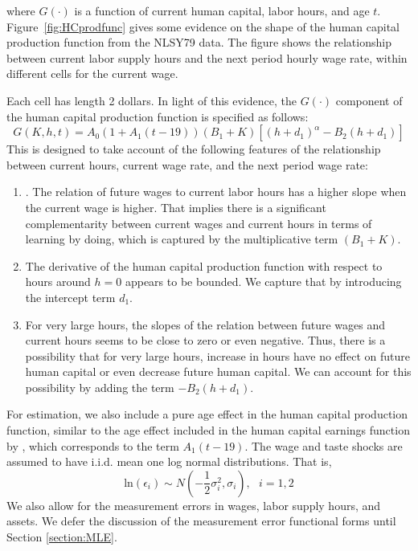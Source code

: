 \documentclass[\econtexRoot/ImaiKeane]{subfiles}
\begin{document}
  where $G(\cdot)$ is a function of current human capital, labor hours, and age $t$. Figure~\ref{fig:HCprodfunc} gives some evidence on the shape of the human capital production function from the NLSY79 data. The figure shows the relationship between current labor supply hours and the next period hourly wage rate, within different cells for the current wage.
%

  Each cell has length 2 dollars. In light of this evidence, the $G(\cdot)$ component of the human capital production function is specified as follows:
  \begin{equation} \tag{4b}
    G(K,h,t) = A_0(1 + A_1(t-19))(B_1+K)[(h+d_1)^{\alpha} - B_2(h+d_1)]
  \end{equation}
  This is designed to take account of the following features of the relationship between current hours, current wage rate, and the next period wage rate:
  \begin{enumerate}
  \item . The relation of future wages to current labor hours has a higher slope when the current wage is higher. That implies there is a significant complementarity between current wages and current hours in terms of learning by doing, which is captured by the multiplicative term $(B_1 + K)$.
  \item The derivative of the human capital production function with respect to hours around $h = 0$ appears to be bounded. We capture that by introducing the intercept term $d_1$.
  \item For very large hours, the slopes of the relation between future wages and current hours seems to be close to zero or even negative. Thus, there is a possibility that for very large hours, increase in hours have no effect on future human capital or even decrease future human capital. We can account for this possibility by adding the term $-B_2(h+d_1)$.
  \end{enumerate}
For estimation, we also include a pure age effect in the human capital production function, similar to the age effect included in the human capital earnings function by \cite{Keane1997-mg}, which corresponds to the term $A_1(t - 19)$. The wage and taste shocks are assumed to have i.i.d. mean one log normal distributions. That is,
  \begin{equation} \tag{7}
    \text{ln} (\epsilon_i) \sim N(-\frac{1}{2} \sigma_i^2, \sigma_i),~~~i=1,2
  \end{equation}
We also allow for the measurement errors in wages, labor supply hours, and assets. We defer the discussion of the measurement error functional forms until Section \ref{section:MLE}. \par
\end{document}
